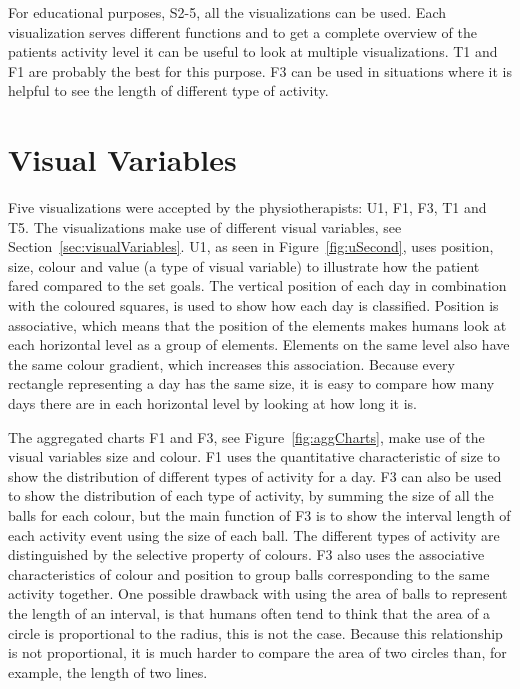 For educational purposes, S2-5, all the visualizations can be used. Each visualization serves different functions and to get a complete overview of the patients activity level it can be useful to look at multiple visualizations. T1 and F1 are probably the best for this purpose. F3 can be used in situations where it is helpful to see the length of different type of activity.

\section{Visual Variables}
Five visualizations were accepted by the physiotherapists: U1, F1, F3, T1 and T5. The visualizations make use of different visual variables, see Section~\ref{sec:visualVariables}. U1, as seen in Figure~\ref{fig:uSecond}, uses position, size, colour and value (a type of visual variable) to illustrate how the patient fared compared to the set goals. The vertical position of each day in combination with the coloured squares, is used to show how each day is classified. Position is associative, which means that the position of the elements makes humans look at each horizontal level as a group of elements. Elements on the same level also have the same colour gradient, which increases this association. Because every rectangle representing a day has the same size, it is easy to compare how many days there are in each horizontal level by looking at how long it is.

The aggregated charts F1 and F3, see Figure~\ref{fig:aggCharts}, make use of the visual variables size and colour. F1 uses the quantitative characteristic of size to show the distribution of different types of activity for a day. F3 can also be used to show the distribution of each type of activity, by summing the size of all the balls for each colour, but the main function of F3 is to show the interval length of each activity event using the size of each ball. The different types of activity are distinguished by the selective property of colours. F3 also uses the associative characteristics of colour and position to group balls corresponding to the same activity together. One possible drawback with using the area of balls to represent the length of an interval, is that humans often tend to think that the area of a circle is proportional to the radius, this is not the case. Because this relationship is not proportional, it is much harder to compare the area of two circles than, for example, the length of two lines.

